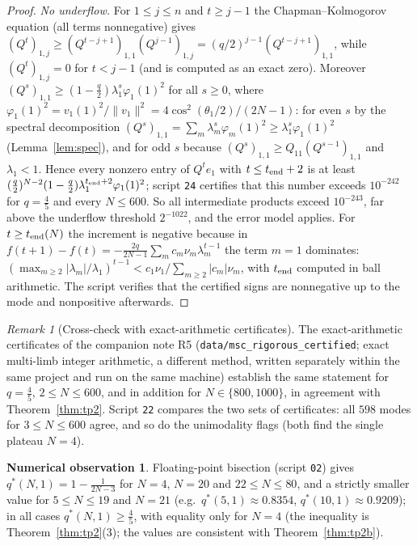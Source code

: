 \documentclass[11pt,a4paper]{article}
\theoremstyle{definition}
\newtheorem{observation}[theorem]{Numerical observation}
\theoremstyle{remark}
\newtheorem{remark}[theorem]{Remark}
\begin{document}
\begin{proof}
\emph{No underflow.} For $1\le j\le n$ and $t\ge j-1$ the Chapman--Kolmogorov equation (all terms nonnegative) gives
$(Q^t)_{1,j}\ge(Q^{t-j+1})_{1,1}(Q^{j-1})_{1,j}=(q/2)^{j-1}(Q^{t-j+1})_{1,1}$, while $(Q^t)_{1,j}=0$ for $t<j-1$
(and is computed as an exact zero). Moreover $(Q^s)_{1,1}\ge(1-\frac q2)\lambda_1^{s}\varphi_1(1)^2$ for all $s\ge0$,
where $\varphi_1(1)^2=v_1(1)^2/\|v_1\|^2=4\cos^2(\theta_1/2)/(2N-1)$: for even $s$ by the spectral decomposition
$(Q^s)_{1,1}=\sum_m\lambda_m^s\varphi_m(1)^2\ge\lambda_1^s\varphi_1(1)^2$ (Lemma~\ref{lem:spec}), and for odd $s$ because
$(Q^s)_{1,1}\ge Q_{11}(Q^{s-1})_{1,1}$ and $\lambda_1<1$. Hence every nonzero entry of $Q^te_1$ with
$t\le t_{\rm end}+2$ is at least $(\frac q2)^{N-2}(1-\frac q2)\lambda_1^{t_{\rm end}+2}\varphi_1(1)^2$; script \texttt{24}
certifies that this number exceeds $10^{-242}$ for $q=\frac45$ and every $N\le600$. So all intermediate products
exceed $10^{-243}$, far above the underflow threshold $2^{-1022}$, and the error model applies. For $t\ge t_{\rm end}(N)$ the increment is negative because in
$f(t+1)-f(t)=-\frac{2q}{2N-1}\sum_mc_m\nu_m\lambda_m^{t-1}$ the term $m=1$ dominates:
$(\max_{m\ge2}|\lambda_m|/\lambda_1)^{t-1}<c_1\nu_1/\sum_{m\ge2}|c_m|\nu_m$, with $t_{\rm end}$ computed in ball
arithmetic. The script verifies that the certified signs are nonnegative up to the mode and nonpositive
afterwards.
\end{proof}

\begin{remark}[Cross-check with exact-arithmetic certificates]\label{rem:t5}
The exact-arithmetic certificates of the companion note R5 (\texttt{data/msc\_rigorous\_certified}; exact multi-limb integer
arithmetic, a different method, written separately within the same project and run on the same machine) establish the
same statement for $q=\frac45$, $2\le N\le600$, and in addition for $N\in\{800,1000\}$, in agreement with
Theorem~\ref{thm:tp2}. Script \texttt{22} compares the two sets of certificates: all $598$ modes for $3\le N\le600$ agree,
and so do the unimodality flags (both find the single plateau $N=4$). %
\end{remark}

\begin{observation}\label{obs:qstar}
Floating-point bisection (script \texttt{02}) gives $q^*(N,1)=1-\frac{1}{2N-3}$ for $N=4$, $N=20$ and
$22\le N\le80$, and a strictly smaller value for $5\le N\le19$ and $N=21$ (e.g.\ $q^*(5,1)\approx0.8354$,
$q^*(10,1)\approx0.9209$); in all cases $q^*(N,1)\ge\frac45$, with equality only for $N=4$ (the inequality is
Theorem~\ref{thm:tp2}(3); the values are consistent with Theorem~\ref{thm:tp2b}).
\end{observation}
\end{document}
